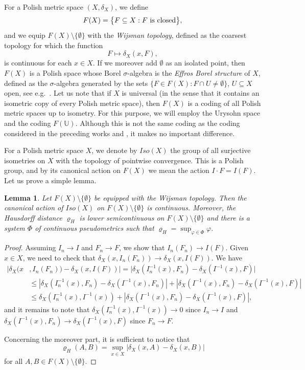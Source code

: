 \documentclass[a4paper]{amsart}
\theoremstyle{plain}
\newtheorem{lemma}[theorem]{Lemma}
\theoremstyle{remark}
\begin{document}
For a Polish metric space $ (X, \delta_{X}) $, we define
$$ F(X) = \big\{ F \subseteq X : \textnormal{$ F $ is closed} \big\}, $$
and we equip $ F(X) \setminus \{ \emptyset \} $ with the \emph{Wijsman topology}, defined as the coarsest topology for which the function
$$ F \mapsto \delta_{X}(x, F), $$
is continuous for each $ x \in X $. If we moreover add $ \emptyset $ as an isolated point, then $ F(X) $ is a Polish space whose Borel $ \sigma $-algebra is the \emph{Effros Borel structure} of $ X $, defined as the $ \sigma $-algebra generated by the sets $ \{ F \in F(X) : F \cap U \neq \emptyset \} $, $ U \subseteq X $ open, see e.g.~\cite{beer}. Let us note that if $ X $ is universal (in the sense that it contains an isometric copy of every Polish metric space), then $ F(X) $ is a coding of all Polish metric spaces up to isometry. For this purpose, we will employ the Urysohn space and the coding $ F(\mathbb{U}) $. Although this is not the same coding as the coding considered in the preceding works \cite{cdk1} and \cite{cdk2}, it makes no important difference.

For a Polish metric space $ X $, we denote by $ Iso(X) $ the group of all surjective isometries on $ X $ with the topology of pointwise convergence. This is a Polish group, and by its canonical action on $ F(X) $ we mean the action $ I \cdot F = I(F) $. Let us prove a simple lemma.


\begin{lemma} \label{lemmawijsman}
Let $ F(X) \setminus \{ \emptyset \} $ be equipped with the Wijsman topology. Then the canonical action of $ Iso(X) $ on $ F(X) \setminus \{ \emptyset \} $ is continuous. Moreover, the Hausdorff distance $ \varrho_{H} $ is lower semicontinuous on $ F(X) \setminus \{ \emptyset \} $ and there is a system $ \Phi $ of continuous pseudometrics such that $ \varrho_{H} = \sup_{\varphi \in \Phi} \varphi $.
\end{lemma}

\begin{proof}
Assuming $ I_{n} \to I $ and $ F_{n} \to F $, we show that $ I_{n}(F_{n}) \to I(F) $. Given $ x \in X $, we need to check that $ \delta_{X}(x, I_{n}(F_{n})) \to \delta_{X}(x, I(F)) $. We have
\begin{align*}
|\delta_{X}(x & , I_{n}(F_{n})) - \delta_{X}(x, I(F))| = |\delta_{X}(I_{n}^{-1}(x), F_{n}) - \delta_{X}(I^{-1}(x), F)| \\
& \leq |\delta_{X}(I_{n}^{-1}(x), F_{n}) - \delta_{X}(I^{-1}(x), F_{n})| + |\delta_{X}(I^{-1}(x), F_{n}) - \delta_{X}(I^{-1}(x), F)| \\
& \leq \delta_{X}(I_{n}^{-1}(x), I^{-1}(x)) + |\delta_{X}(I^{-1}(x), F_{n}) - \delta_{X}(I^{-1}(x), F)|,
\end{align*}
and it remains to note that $ \delta_{X}(I_{n}^{-1}(x), I^{-1}(x)) \to 0 $ since $ I_{n} \to I $ and $ \delta_{X}(I^{-1}(x), F_{n}) \to \delta_{X}(I^{-1}(x), F) $ since $ F_{n} \to F $.

Concerning the moreover part, it is sufficient to notice that
$$ \varrho_{H}(A, B) = \sup_{x \in X} |\delta_{X}(x, A) - \delta_{X}(x, B)| $$
for all $ A, B \in F(X) \setminus \{ \emptyset \} $.
\end{proof}
\end{document}
